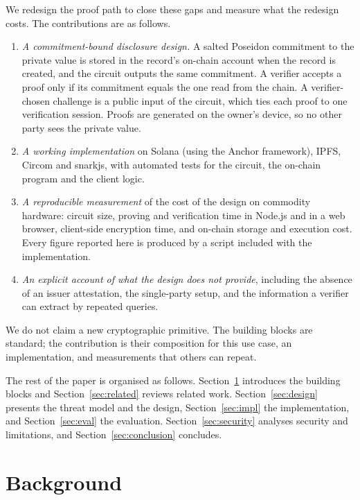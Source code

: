 We redesign the proof path to close these gaps and measure what the redesign
costs. The contributions are as follows.
\begin{enumerate}
  \item \emph{A commitment-bound disclosure design.} A salted Poseidon
  commitment to the private value is stored in the record's on-chain account
  when the record is created, and the circuit outputs the same commitment.
  A verifier accepts a proof only if its commitment equals the one read from
  the chain. A verifier-chosen challenge is a public input of the circuit,
  which ties each proof to one verification session. Proofs are generated on
  the owner's device, so no other party sees the private value.
  \item \emph{A working implementation} on Solana (using the Anchor
  framework), IPFS, Circom and snarkjs, with automated tests for the
  circuit, the on-chain program and the client logic.
  \item \emph{A reproducible measurement} of the cost of the design on
  commodity hardware: circuit size, proving and verification time in Node.js
  and in a web browser, client-side encryption time, and on-chain storage
  and execution cost. Every figure reported here is produced by a script
  included with the implementation.
  \item \emph{An explicit account of what the design does not provide},
  including the absence of an issuer attestation, the single-party setup,
  and the information a verifier can extract by repeated queries.
\end{enumerate}

We do not claim a new cryptographic primitive. The building blocks are
standard; the contribution is their composition for this use case, an
implementation, and measurements that others can repeat.

The rest of the paper is organised as follows. Section~\ref{sec:background}
introduces the building blocks and Section~\ref{sec:related} reviews related
work. Section~\ref{sec:design} presents the threat model and the design,
Section~\ref{sec:impl} the implementation, and Section~\ref{sec:eval} the
evaluation. Section~\ref{sec:security} analyses security and limitations,
and Section~\ref{sec:conclusion} concludes.

\section{Background}\label{sec:background}


